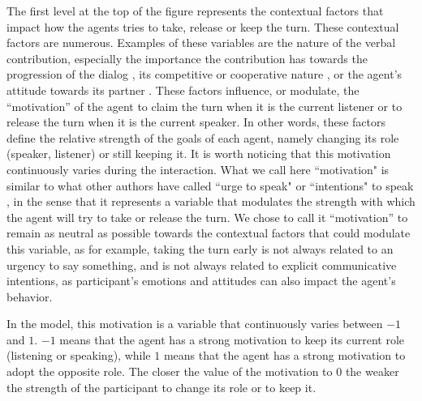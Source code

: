 The first level at the top of the figure represents the contextual factors that impact how the agents tries to take, release or keep the turn. These contextual factors are numerous. Examples of these variables are the nature of the verbal contribution, especially the importance the contribution has towards the progression of the dialog \citep{selfridge_bidding_2009}, its competitive or cooperative nature \citep{cafaro_effects_2016}, or the agent's attitude towards its partner \citep{ter_maat_how_2010}. 
These factors influence, or modulate, the ``motivation'' of the agent to claim the turn when it is the current listener or to release the turn when it is the current speaker. 
In other words, these factors define the relative strength of the goals of each agent, namely changing its role (speaker, listener) or still keeping it. It is worth noticing that this motivation continuously varies during the interaction. 
What we call here ``motivation" is similar to what other authors have called ``urge to speak" \citep{thorisson_multiparty_2010} or ``intentions"  to speak \citep{lessmann_towards_2004}, in the sense that it represents a variable that modulates the strength with which the agent will try to take or release the turn. We chose to call it ``motivation'' to remain as neutral as possible towards the contextual factors that could modulate this variable, as for example, taking the turn early is not always related to an urgency to say something, and is not always related to explicit communicative intentions, as participant's emotions and attitudes can also impact the agent's behavior. 

In the  model, this motivation is a variable that continuously varies between $-1$ and $1$. 
$-1$ means that the agent has a strong motivation to keep its current role (listening or speaking), while
$1$ means that the agent has a strong motivation to adopt the opposite role. 
The closer the value of the motivation to $0$ the weaker the strength of the participant to change its role or to keep it. 

